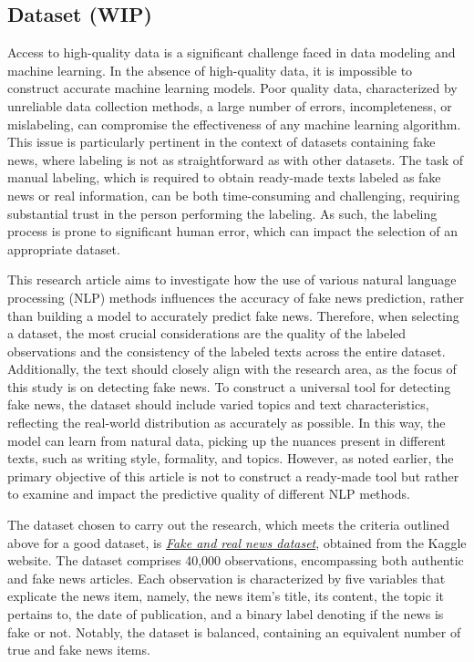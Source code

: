 \subsection{Dataset (WIP)}
Access to high-quality data is a significant challenge faced in data modeling and machine learning. In the absence of high-quality data, it is impossible to construct accurate machine learning models. Poor quality data, characterized by unreliable data collection methods, a large number of errors, incompleteness, or mislabeling, can compromise the effectiveness of any machine learning algorithm. This issue is particularly pertinent in the context of datasets containing fake news, where labeling is not as straightforward as with other datasets. The task of manual labeling, which is required to obtain ready-made texts labeled as fake news or real information, can be both time-consuming and challenging, requiring substantial trust in the person performing the labeling. As such, the labeling process is prone to significant human error, which can impact the selection of an appropriate dataset.

This research article aims to investigate how the use of various natural language processing (NLP) methods influences the accuracy of fake news prediction, rather than building a model to accurately predict fake news. Therefore, when selecting a dataset, the most crucial considerations are the quality of the labeled observations and the consistency of the labeled texts across the entire dataset. Additionally, the text should closely align with the research area, as the focus of this study is on detecting fake news. To construct a universal tool for detecting fake news, the dataset should include varied topics and text characteristics, reflecting the real-world distribution as accurately as possible. In this way, the model can learn from natural data, picking up the nuances present in different texts, such as writing style, formality, and topics. However, as noted earlier, the primary objective of this article is not to construct a ready-made tool but rather to examine and impact the predictive quality of different NLP methods. 

The dataset chosen to carry out the research, which meets the criteria outlined above for a good dataset, is \href{https://www.kaggle.com/datasets/clmentbisaillon/fake-and-real-news-dataset}{\textit{Fake and real news dataset}}, obtained from the Kaggle website. The dataset comprises 40,000 observations, encompassing both authentic and fake news articles. Each observation is characterized by five variables that explicate the news item, namely, the news item's title, its content, the topic it pertains to, the date of publication, and a binary label denoting if the news is fake or not. Notably, the dataset is balanced, containing an equivalent number of true and fake news items.

